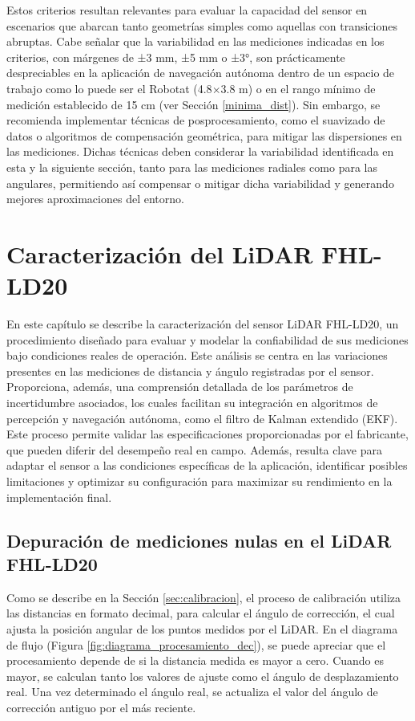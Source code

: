 Estos criterios resultan relevantes para evaluar la capacidad del sensor en escenarios que abarcan tanto geometrías simples como aquellas con transiciones abruptas. Cabe señalar que la variabilidad en las mediciones indicadas en los criterios, con márgenes de ±3 mm, ±5 mm o ±3°, son prácticamente despreciables en la aplicación de navegación autónoma dentro de un espacio de trabajo como lo puede ser el Robotat (4.8$\times$3.8 m) o en el rango mínimo de medición establecido de 15 cm (ver Sección \ref{minima_dist}). Sin embargo, se recomienda implementar técnicas de posprocesamiento, como el suavizado de datos o algoritmos de compensación geométrica, para mitigar las dispersiones en las mediciones. Dichas técnicas deben considerar la variabilidad identificada en esta y la siguiente sección, tanto para las mediciones radiales como para las angulares, permitiendo así compensar o mitigar dicha variabilidad y generando mejores aproximaciones del entorno.

\chapter{Caracterización del LiDAR FHL-LD20}
\label{caracterizacion}
En este capítulo se describe la caracterización del sensor LiDAR FHL-LD20, un procedimiento diseñado para evaluar y modelar la confiabilidad de sus mediciones bajo condiciones reales de operación. Este análisis se centra en las variaciones presentes en las mediciones de distancia y ángulo registradas por el sensor. Proporciona, además, una comprensión detallada de los parámetros de incertidumbre asociados, los cuales facilitan su integración en algoritmos de percepción y navegación autónoma, como el filtro de Kalman extendido (EKF). Este proceso permite validar las especificaciones proporcionadas por el fabricante, que pueden diferir del desempeño real en campo. Además, resulta clave para adaptar el sensor a las condiciones específicas de la aplicación, identificar posibles limitaciones y optimizar su configuración para maximizar su rendimiento en la implementación final.

\section{Depuración de mediciones nulas en el LiDAR FHL-LD20}
Como se describe en la Sección \ref{sec:calibracion}, el proceso de calibración utiliza las distancias en formato decimal, para calcular el ángulo de corrección, el cual ajusta la posición angular de los puntos medidos por el LiDAR. En el diagrama de flujo (Figura \ref{fig:diagrama_procesamiento_dec}), se puede apreciar que el procesamiento depende de si la distancia medida es mayor a cero. Cuando es mayor, se calculan tanto los valores de ajuste como el ángulo de desplazamiento real. Una vez determinado el ángulo real, se actualiza el valor del ángulo de corrección antiguo por el más reciente.


